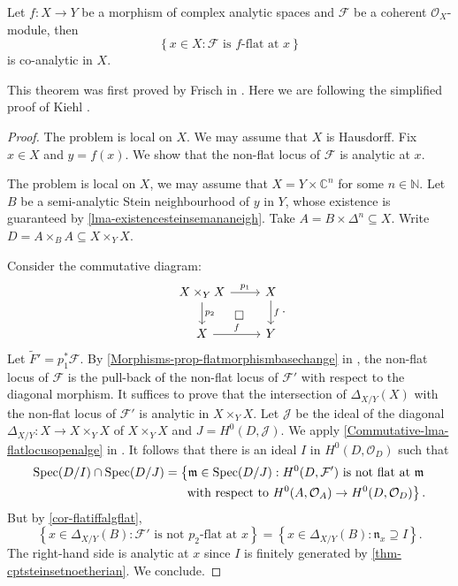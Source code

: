 \begin{thm}\label{thm-flatlocuscoana}
    Let $f:X\rightarrow Y$ be a morphism of complex analytic spaces and $\mathcal{F}$ be a coherent $\mathcal{O}_X$-module, then
    \[
        \left\{ x\in X: \mathcal{F}\text{ is }f\text{-flat at }x   \right\}
    \]  
    is co-analytic in $X$. 
\end{thm}
This theorem was first proved by Frisch in \cite{Fri67}. Here we are following the simplified proof of Kiehl \cite{Kie67}.
\begin{proof}

    The problem is local on $X$. We may assume that $X$ is Hausdorff.
    Fix $x\in X$ and $y=f(x)$. We show that the non-flat locus of $\mathcal{F}$ is analytic at $x$. 

    The problem is local on $X$, we may assume that $X=Y\times \mathbb{C}^n$ for some $n\in \mathbb{N}$.
    Let $B$ be a semi-analytic Stein neighbourhood of $y$ in $Y$, whose existence is guaranteed by \cref{lma-existencesteinsemananeigh}. Take $A=B\times \Delta^n\subseteq X$. Write $D=A\times_B A\subseteq X\times_Y X$.

    Consider the commutative diagram:
    \[
        \begin{tikzcd}
            X\times_Y X \arrow[r,"p_1"] \arrow[d,"p_2"] \arrow[rd, "\square", phantom] & X \arrow[d, "f"] \\
            X \arrow[r, "f"]                                               & Y               
        \end{tikzcd}.    
    \]
    Let $\tilde{F}'=p_1^*\mathcal{F}$.
    By \cref{Morphisms-prop-flatmorphismbasechange}  in , the non-flat locus of $\mathcal{F}$ is the pull-back of the non-flat locus of $\mathcal{F}'$ with respect to the diagonal morphism. It suffices to prove that the intersection of $\Delta_{X/Y}(X)$ with the non-flat locus of $\mathcal{F}'$ is analytic in $X\times_Y X$. Let $\mathcal{J}$ be the ideal of the diagonal $\Delta_{X/Y}:X\rightarrow X\times_Y X$ of $X\times_Y X$ and $J=H^0(D,\mathcal{J})$. We apply \cref{Commutative-lma-flatlocusopenalge} in . It follows that there is an ideal $I$ in $H^0(D,\mathcal{O}_D)$ such that
    \[
        \begin{split}
        \operatorname{Spec} (D/I)\cap \operatorname{Spec} (D/J)=\left\{\mathfrak{m}\in \operatorname{Spec} (D/J): H^0(D,\mathcal{F}')\text{ is not flat at }\mathfrak{m}\right.\\
        \left.\text{ with respect to } H^0(A,\mathcal{O}_A)\rightarrow H^0(D,\mathcal{O}_D) \right\}.  
        \end{split}
    \]
    But by \cref{cor-flatiffalgflat},
    \[
        \left\{x\in \Delta_{X/Y}(B): \mathcal{F}'\text{ is not } p_2\text{-flat at }x  \right\}=\left\{ x\in \Delta_{X/Y}(B): \mathfrak{n}_x\supseteq I\right\}.  
    \]
    The right-hand side is analytic at $x$ since $I$ is finitely generated by \cref{thm-cptsteinsetnoetherian}.
    We conclude.
\end{proof}

